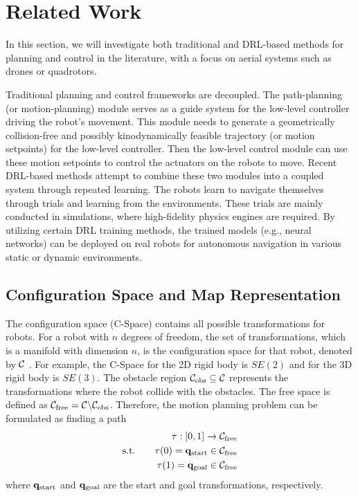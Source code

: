 \documentclass[letterpaper,journal,twoside]{IEEEtran}
\begin{document}
\section{Related Work}

In this section, we will investigate both traditional 
and DRL-based methods for planning and control in the 
literature, with a focus on aerial systems 
such as drones or quadrotors.

Traditional planning and control frameworks are decoupled.
The path-planning (or motion-planning) module serves as a guide system 
for the low-level controller driving the robot's movement. 
This module needs to generate a geometrically 
collision-free and possibly kinodynamically feasible trajectory 
(or motion setpoints) for the low-level controller.
Then the low-level control module can use these motion 
setpoints to control the actuators on the robots to move.
Recent DRL-based methods attempt to combine these two modules 
into a coupled system through repeated learning. 
The robots learn to navigate themselves through trials and learning 
from the environments.
These trials are mainly conducted in simulations, 
where high-fidelity physics engines are required. 
By utilizing certain DRL training methods, 
the trained models (e.g., neural networks) can be deployed 
on real robots for autonomous navigation in various static 
or dynamic environments.

\subsection{Configuration Space and Map Representation}
The configuration space (C-Space) contains all possible transformations
for robots. 
For a robot with $n$ degrees of freedom, the set of 
transformations, which is a manifold with dimension $n$, is 
the configuration space for that robot, denoted by $\mathcal{C}$
\cite{quan2020survey}. 
For example, the C-Space for the 2D rigid body is $SE(2)$ 
and for the 3D rigid body is $SE(3)$.
The obstacle region $\mathcal{C}_{\text{obs}} \subseteq \mathcal{C}$ 
represents the transformations where the robot collide with the obstacles. 
The free space is defined as $\mathcal{C}_{\text{free}} = 
\mathcal{C} \backslash \mathcal{C}_{\text{obs}}$.
Therefore, the motion planning problem can be formulated as 
finding a path 
\[
\begin{aligned}
  &&\tau : \left[0,1\right]\rightarrow \mathcal{C}_{\text{free}} \\
  &\text{s.t.}\quad&\tau(0) = \mathbf{q}_{\text{start}} \in \mathcal{C}_{\text{free}} \\
  &&\tau(1) = \mathbf{q}_{\text{goal}} \in \mathcal{C}_{\text{free}}
\end{aligned}
\]
where $\mathbf{q}_{\text{start}}$ and $\mathbf{q}_{\text{goal}}$ are the start and goal transformations, respectively.
\end{document}
